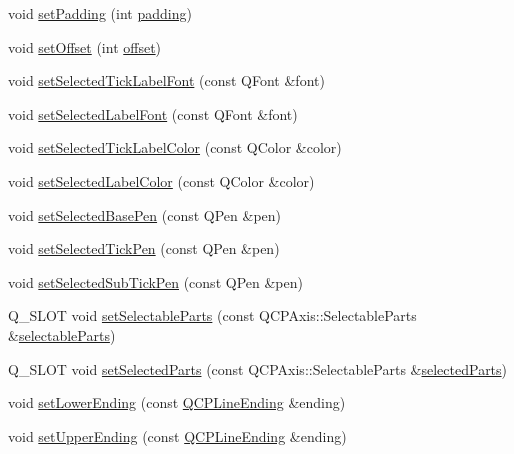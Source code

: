 \begin{DoxyCompactItemize}
\item 
void \mbox{\hyperlink{class_q_c_p_axis_a5691441cb3de9e9844855d339c0db279}{set\+Padding}} (int \mbox{\hyperlink{class_q_c_p_axis_a07df379d5c017b8f3a4702532eb037b2}{padding}})
\item 
void \mbox{\hyperlink{class_q_c_p_axis_a04a652603cbe50eba9969ee6d68873c3}{set\+Offset}} (int \mbox{\hyperlink{class_q_c_p_axis_aef66fa16353b4993b1cceabfb644a1a9}{offset}})
\item 
void \mbox{\hyperlink{class_q_c_p_axis_a845ccb560b7bc5281098a5be494145f6}{set\+Selected\+Tick\+Label\+Font}} (const Q\+Font \&font)
\item 
void \mbox{\hyperlink{class_q_c_p_axis_a02ec2a75d4d8401eaab834fbc6803d30}{set\+Selected\+Label\+Font}} (const Q\+Font \&font)
\item 
void \mbox{\hyperlink{class_q_c_p_axis_a9bdbf5e63ab15187f3a1de9440129227}{set\+Selected\+Tick\+Label\+Color}} (const Q\+Color \&color)
\item 
void \mbox{\hyperlink{class_q_c_p_axis_a5d502dec597c634f491fdd73d151c72d}{set\+Selected\+Label\+Color}} (const Q\+Color \&color)
\item 
void \mbox{\hyperlink{class_q_c_p_axis_aeb917a909215605b95ef2be843de1ee8}{set\+Selected\+Base\+Pen}} (const Q\+Pen \&pen)
\item 
void \mbox{\hyperlink{class_q_c_p_axis_a8360502685eb782edbf04019c9345cdc}{set\+Selected\+Tick\+Pen}} (const Q\+Pen \&pen)
\item 
void \mbox{\hyperlink{class_q_c_p_axis_a2a00a7166600155eac26843132eb9576}{set\+Selected\+Sub\+Tick\+Pen}} (const Q\+Pen \&pen)
\item 
Q\+\_\+\+S\+L\+OT void \mbox{\hyperlink{class_q_c_p_axis_a513f9b9e326c505d9bec54880031b085}{set\+Selectable\+Parts}} (const Q\+C\+P\+Axis\+::\+Selectable\+Parts \&\mbox{\hyperlink{class_q_c_p_axis_a1d12d157756c114f4e57517c62177181}{selectable\+Parts}})
\item 
Q\+\_\+\+S\+L\+OT void \mbox{\hyperlink{class_q_c_p_axis_ab9d7a69277dcbed9119b3c1f25ca19c3}{set\+Selected\+Parts}} (const Q\+C\+P\+Axis\+::\+Selectable\+Parts \&\mbox{\hyperlink{class_q_c_p_axis_a893e8d6cfed9267eb2b793cb1d2b4dce}{selected\+Parts}})
\item 
void \mbox{\hyperlink{class_q_c_p_axis_a08af1c72db9ae4dc8cb8a973d44405ab}{set\+Lower\+Ending}} (const \mbox{\hyperlink{class_q_c_p_line_ending}{Q\+C\+P\+Line\+Ending}} \&ending)
\item 
void \mbox{\hyperlink{class_q_c_p_axis_a69119b892fc306f651763596685aa377}{set\+Upper\+Ending}} (const \mbox{\hyperlink{class_q_c_p_line_ending}{Q\+C\+P\+Line\+Ending}} \&ending)

\end{DoxyCompactItemize}
